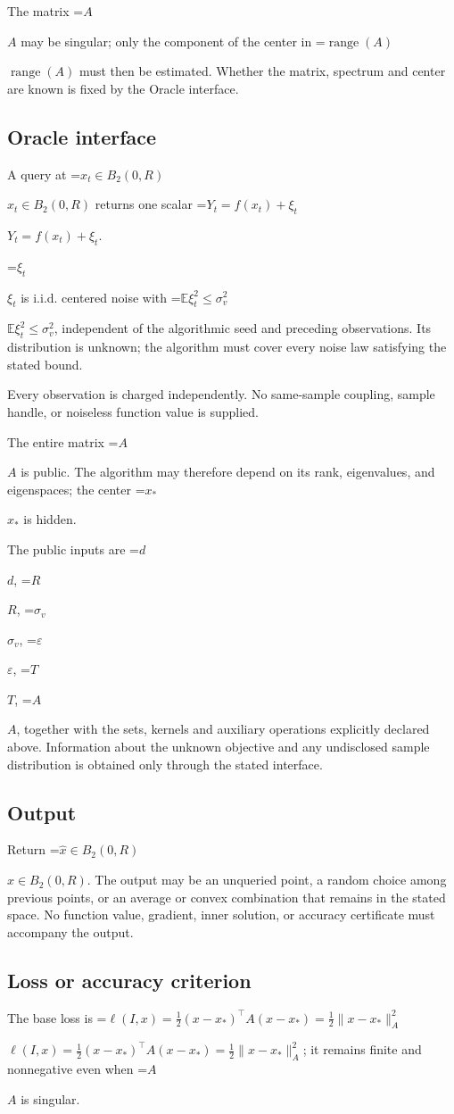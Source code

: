 \documentclass[10pt,a4paper]{article}
\newcommand{\AtlasMath}[1]{\par\begingroup\centering\setbox0=\hbox{$\displaystyle #1$}\ifdim\wd0>1.4\linewidth\typeout{ATLAS WIDE FORMULA: \the\wd0}\fi\ifdim\wd0>\linewidth\resizebox{\linewidth}{!}{\box0}\else\box0\fi\par\endgroup}
\newcommand{\AtlasInlineMath}[1]{\begingroup\setbox0=\hbox{$#1$}\ifdim\wd0>.4\linewidth\endgroup\AtlasMath{#1}\else\endgroup$#1$\fi}
\begin{document}
The matrix \AtlasInlineMath{A} may be singular; only the component of the center in \AtlasInlineMath{\operatorname{range}(A)} must then be estimated. Whether the matrix, spectrum and center are known is fixed by the Oracle interface.

\subsection{Oracle interface}
A query at \AtlasInlineMath{x_t\in B_2(0,R)} returns one scalar \AtlasInlineMath{Y_t=f(x_t)+\xi_t}.

\AtlasInlineMath{\xi_t} is i.i.d. centered noise with \AtlasInlineMath{\mathbb{E}\xi_t^2\le\sigma_v^2}, independent of the algorithmic seed and preceding observations. Its distribution is unknown; the algorithm must cover every noise law satisfying the stated bound.

Every observation is charged independently. No same-sample coupling, sample handle, or noiseless function value is supplied.

The entire matrix \AtlasInlineMath{A} is public. The algorithm may therefore depend on its rank, eigenvalues, and eigenspaces; the center \AtlasInlineMath{x_*} is hidden.

The public inputs are \AtlasInlineMath{d}, \AtlasInlineMath{R}, \AtlasInlineMath{\sigma_v}, \AtlasInlineMath{\varepsilon}, \AtlasInlineMath{T}, \AtlasInlineMath{A}, together with the sets, kernels and auxiliary operations explicitly declared above. Information about the unknown objective and any undisclosed sample distribution is obtained only through the stated interface.

\subsection{Output}
Return \AtlasInlineMath{\widehat{x}\in B_2(0,R)}. The output may be an unqueried point, a random choice among previous points, or an average or convex combination that remains in the stated space. No function value, gradient, inner solution, or accuracy certificate must accompany the output.

\subsection{Loss or accuracy criterion}
The base loss is \AtlasInlineMath{\ell(I,x)=\frac12(x-x_*)^\top A(x-x_*)=\frac12\|x-x_*\|_A^2}; it remains finite and nonnegative even when \AtlasInlineMath{A} is singular.
\end{document}
